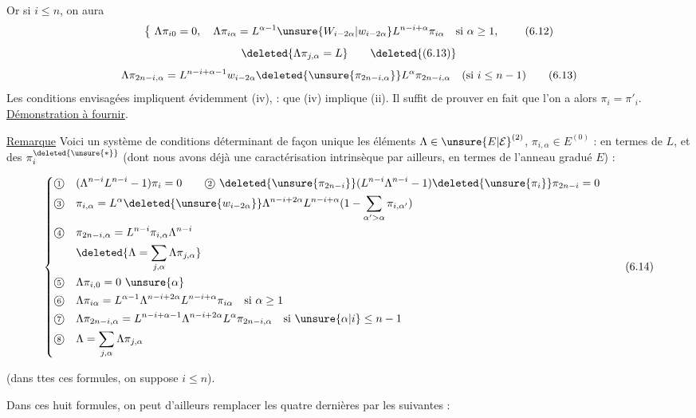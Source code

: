 
Or si $i\le n$, on aura
\[
 \left\{\ \Lambda\pi_{i0}=0,\quad \Lambda\pi_{i\alpha}=L^{\alpha-1}\unsure{W_{i-2\alpha}|w_{i-2\alpha}} L^{n-i+\alpha}\pi_{i\alpha}\quad\text{si }\alpha\ge1,\right.
 \tag*{(6.12)}
\]
\[
 \deleted{\Lambda\pi_{j,\alpha}=L}\tag*{\deleted{(6.13)}}
\]
\[
 \Lambda\pi_{2n-i,\alpha}=L^{n-i+\alpha-1}w_{i-2\alpha}\deleted{\unsure{\pi_{2n-i,\alpha}}}L^\alpha\pi_{2n-i,\alpha}\quad(\text{si }i\le n-1)
 \tag*{(6.13)}
\]
Les conditions envisagées impliquent évidemment (iv), :  que (iv) implique (ii). Il suffit de prouver en fait que l'on a alors $\pi_i=\pi'_i$. \uline{Démonstration à fournir}.

\uline{Remarque} Voici un système de conditions déterminant de façon unique les éléments $\Lambda\in\unsure{E|\mathcal E}^{(2)}$, $\pi_{i,\alpha}\in E^{(0)}$ : en termes de $L$, et des $\pi_i^{\deleted{\unsure{*}}}$ (dont nous avons déjà une caractérisation intrinsèque par ailleurs, en termes de l'anneau gradué $E$) :

\[
 \left\{\begin{aligned}
 \text{\textcircled{\scriptsize 1}}\quad&(\Lambda^{n-i}L^{n-i}-1)\pi_i=0\qquad
 \text{\textcircled{\scriptsize 2}}\ \deleted{\unsure{\pi_{2n-i}}}(L^{n-i}\Lambda^{n-i}-1)\deleted{\unsure{\pi_i}}\pi_{2n-i}=0\\
 \text{\textcircled{\scriptsize 3}}\quad&\pi_{i,\alpha}=L^\alpha\deleted{\unsure{w_{i-2\alpha}}}\Lambda^{n-i+2\alpha}L^{n-i+\alpha}(1-\sum_{\alpha'>\alpha}\pi_{i,\alpha'})\\
 \text{\textcircled{\scriptsize 4}}\quad&\pi_{2n-i,\alpha}=L^{n-i}\pi_{i,\alpha}\Lambda^{n-i}\\
 &\deleted{\Lambda=\sum_{j,\alpha}\Lambda\pi_{j,\alpha}}\\
 \text{\textcircled{\scriptsize 5}}\quad&\Lambda\pi_{i,0}=0\ \unsure{\alpha}\\
 \text{\textcircled{\scriptsize 6}}\quad&\Lambda\pi_{i\alpha}=L^{\alpha-1}\Lambda^{n-i+2\alpha}L^{n-i+\alpha}\pi_{i\alpha}\quad\text{si }\alpha\ge1\\
 \text{\textcircled{\scriptsize 7}}\quad&\Lambda\pi_{2n-i,\alpha}=L^{n-i+\alpha-1}\Lambda^{n-i+2\alpha}L^\alpha\pi_{2n-i,\alpha}\quad\text{si }\unsure{\alpha|i}\le n-1\\
 \text{\textcircled{\scriptsize 8}}\quad&\Lambda=\sum_{j,\alpha}\Lambda\pi_{j,\alpha}
 \end{aligned}\right.
 \tag*{(6.14)}
\]

(dans ttes ces formules, on suppose $i\le n$).

Dans ces huit formules, on peut d'ailleurs remplacer les quatre dernières par les suivantes  :
